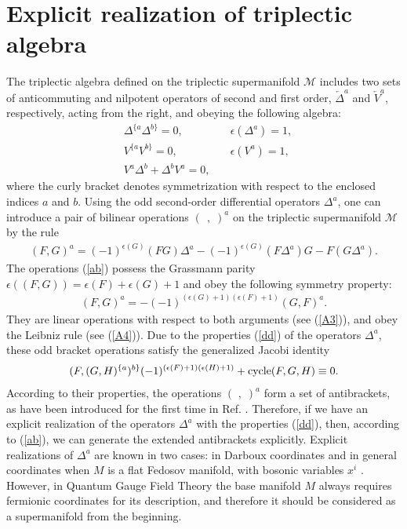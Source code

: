 \documentclass[a4paper,11pt]{article}
\begin{document}
\section{Explicit realization of triplectic algebra}

The triplectic algebra defined on the triplectic supermanifold $\mathcal{M}$
includes two sets of anticommuting and nilpotent operators of second and
first order, $\overleftarrow{\Delta }^{a}$ and $\overleftarrow{V}^{a}$,
respectively, acting from the right, and obeying the following
algebra:
\begin{eqnarray}
&\Delta^{\{a}\Delta^{b\}} =0,& \quad \epsilon(\Delta^a)=1,\label{dd} \\
&V^{\{a}V^{b\}} =0,&\quad \epsilon(V^a)=1, \label{vv}\\
&V^a\Delta^b +\Delta^bV^a =0, &\label{vd}
\end{eqnarray}
where the curly bracket denotes symmetrization with respect to the enclosed
indices $a$ and $b$. Using the odd second-order differential
operators $\Delta ^{a}$, one can introduce a pair of bilinear operations $%
(\;\,,\;)^{a}$ on the triplectic supermanifold $\mathcal{M}$ by the rule
\begin{eqnarray}
\label{ab}
(F,G)^a = (-1)^{\epsilon(G)}(FG)\Delta^a - (-1)^{\epsilon(G)}(F\Delta^a) G
 - F(G\Delta^a ).
\label{liebdelta}
\end{eqnarray}
The operations (\ref{ab}) possess the Grassmann parity $\epsilon
((F,G))=\epsilon (F)+\epsilon (G)+1$ and obey the following symmetry
property:
\begin{eqnarray}
\label{symab}
(F,G)^a =-(-1)^{(\epsilon(G)+1)(\epsilon(F)+1)}(G,F)^a.
\label{liebdelta}
\end{eqnarray}
They are linear operations with respect to both arguments (see (\ref{A3})),
and obey the Leibniz rule (see (\ref{A4})). Due to the properties (\ref{dd})
of the operators $\Delta ^{a}$, these odd bracket operations satisfy the
generalized Jacobi identity
\begin{eqnarray}
\label{jiab}
(F,(G,H)^{\{a})^{b\}}(-1)^{(\epsilon(F)+1)(\epsilon(H)+1)}
+ {\rm cycle} (F,G,H)\equiv 0.
\end{eqnarray}
According to their properties, the operations $(\,\,,\;)^{a}$ form a set of
antibrackets, as have been introduced for the first time in Ref. \cite{BLT}.
Therefore, if we have an explicit realization of the operators $\Delta ^{a}$
with the properties (\ref{dd}), then, according to (\ref{ab}), we can
generate the extended antibrackets explicitly. Explicit realizations of $%
\Delta ^{a}$ are known in two cases: in Darboux coordinates \cite
{BLT,3pl,mod3pl} and in general coordinates when $M$ is a flat Fedosov
manifold, with bosonic variables $x^{i}$ \cite{gln}. However, in Quantum
Gauge Field Theory the base manifold $M$ always requires fermionic
coordinates for its description, and therefore it should be considered as a
supermanifold from the beginning.
\end{document}
